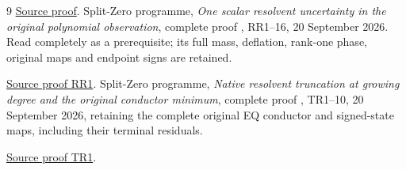 \documentclass[11pt]{article}
\begin{document}
\begin{thebibliography}{9}
\href{https://github.com/KokunoYumeto/zeta-function-research-reader/blob/5992ad50c0f2a06921f1fcaded7b4e38097c0739/workbenches/splitzero-tandem/continuations/20260920-original-kernel-mixed-determinants/providers/NATIVE_RESOLVENT_MOMENT_ENCLOSURES.tex\#L1}{Source proof}.
 Split-Zero programme, \emph{One scalar resolvent
uncertainty in the original polynomial observation}, complete proof
, RR1--16, 20 September 2026.
Read completely as a prerequisite; its full mass, deflation,
rank-one phase, original maps and endpoint signs are retained.

\href{https://github.com/KokunoYumeto/zeta-function-research-reader/blob/5992ad50c0f2a06921f1fcaded7b4e38097c0739/workbenches/splitzero-tandem/continuations/20260920-original-kernel-mixed-determinants/providers/NATIVE_RESOLVENT_RANK_ONE.tex\#L50}{Source proof RR1}.
 Split-Zero programme, \emph{Native resolvent truncation at
growing degree and the original conductor minimum}, complete proof
, TR1--10,
20 September 2026, retaining the complete original EQ conductor
and signed-state maps, including their terminal residuals.

\href{https://github.com/KokunoYumeto/zeta-function-research-reader/blob/5992ad50c0f2a06921f1fcaded7b4e38097c0739/workbenches/splitzero-tandem/continuations/20260920-original-kernel-mixed-determinants/providers/NATIVE_TRUNCATION_CONDUCTOR_RETURN.tex\#L54}{Source proof TR1}.
\end{thebibliography}
\end{document}
